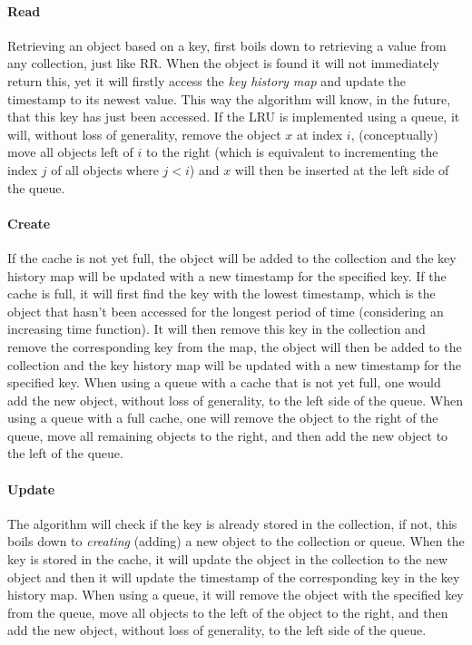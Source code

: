 \documentclass[pdftex,a4paper,12pt,twoside]{report}
\begin{document}
\paragraph{Read} Retrieving an object based on a key, first boils down to retrieving a value from any collection, just like RR. When the object is found it will not immediately return this, yet it will firstly access the \emph{key history map} and update the timestamp to its newest value. This way the algorithm will know, in the future, that this key has just been accessed. If the LRU is implemented using a queue, it will, without loss of generality, remove the object $x$ at index $i$, (conceptually) move all objects left of $i$ to the right (which is equivalent to incrementing the index $j$ of all objects where $j < i$) and $x$ will then be inserted at the left side of the queue.
\paragraph{Create} If the cache is not yet full, the object will be added to the collection and the key history map will be updated with a new timestamp for the specified key. If the cache is full, it will first find the key with the lowest timestamp, which is the object that hasn't been accessed for the longest period of time (considering an increasing time function). It will then remove this key in the collection and remove the corresponding key from the map, the object will then be added to the collection and the key history map will be updated with a new timestamp for the specified key. When using a queue with a cache that is not yet full, one would add the new object, without loss of generality, to the left side of the queue. When using a queue with a full cache, one will remove the object to the right of the queue, move all remaining objects to the right, and then add the new object to the left of the queue.
\paragraph{Update} The algorithm will check if the key is already stored in the collection, if not, this boils down to \emph{creating} (adding) a new object to the collection or queue. When the key is stored in the cache, it will update the object in the collection to the new object and then it will update the timestamp of the corresponding key in the key history map. When using a queue, it will remove the object with the specified key from the queue, move all objects to the left of the object to the right, and then add the new object, without loss of generality, to the left side of the queue.
\end{document}
